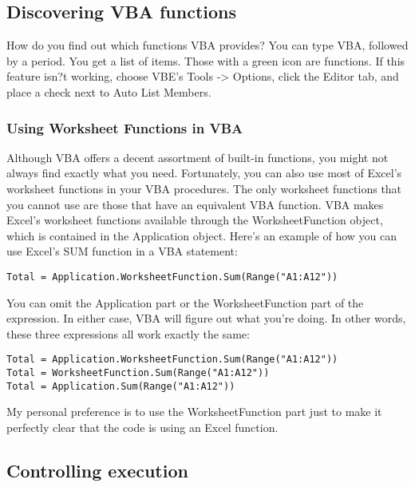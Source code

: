\documentclass[
]{article}
\theoremstyle{definition}
\theoremstyle{definition}
\theoremstyle{definition}
\theoremstyle{definition}
\theoremstyle{remark}
\begin{document}
\hypertarget{discovering-vba-functions}{%
\subsection{Discovering VBA functions}\label{discovering-vba-functions}}

How do you find out which functions VBA provides? You can type VBA, followed by a period. You get a list of items. Those with a green icon
are functions. If this feature isn?t working, choose VBE's Tools -\textgreater{} Options, click the Editor tab, and place a check next to Auto List Members.

\hypertarget{using-worksheet-functions-in-vba}{%
\subsubsection{Using Worksheet Functions in VBA}\label{using-worksheet-functions-in-vba}}

Although VBA offers a decent assortment of built-in functions, you might not always find exactly what you need. Fortunately, you can also use most of Excel's worksheet functions in your VBA procedures. The only
worksheet functions that you cannot use are those that have an equivalent VBA function. VBA makes Excel's worksheet functions available through the WorksheetFunction object, which is contained in the Application object. Here's an example of how you can use Excel's SUM function in a VBA statement:

\begin{verbatim}
Total = Application.WorksheetFunction.Sum(Range("A1:A12"))
\end{verbatim}

You can omit the Application part or the WorksheetFunction part of the expression. In either case, VBA will figure out what you're doing. In
other words, these three expressions all work exactly the same:

\begin{verbatim}
Total = Application.WorksheetFunction.Sum(Range("A1:A12"))
Total = WorksheetFunction.Sum(Range("A1:A12"))
Total = Application.Sum(Range("A1:A12"))
\end{verbatim}

My personal preference is to use the WorksheetFunction part just to make
it perfectly clear that the code is using an Excel function.

\hypertarget{controlling-execution}{%
\subsection{Controlling execution}\label{controlling-execution}}
\end{document}
